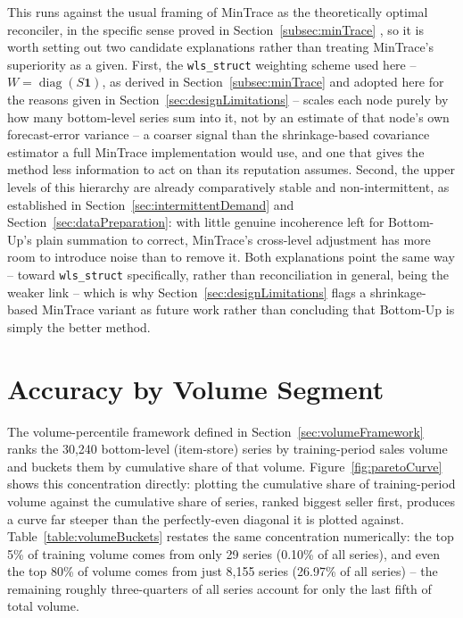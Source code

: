 This runs against the usual framing of MinTrace as the theoretically optimal reconciler, in the specific sense proved in Section~\ref{subsec:minTrace} \cite{Wickramasuriya:2019}, so it is worth setting out two candidate explanations rather than treating MinTrace's superiority as a given. First, the \texttt{wls\_struct} weighting scheme used here -- $W = \operatorname{diag}(S\mathbf{1})$, as derived in Section~\ref{subsec:minTrace} and adopted here for the reasons given in Section~\ref{sec:designLimitations} -- scales each node purely by how many bottom-level series sum into it, not by an estimate of that node's own forecast-error variance -- a coarser signal than the shrinkage-based covariance estimator a full MinTrace implementation would use, and one that gives the method less information to act on than its reputation assumes. Second, the upper levels of this hierarchy are already comparatively stable and non-intermittent, as established in Section~\ref{sec:intermittentDemand} and Section~\ref{sec:dataPreparation}: with little genuine incoherence left for Bottom-Up's plain summation to correct, MinTrace's cross-level adjustment has more room to introduce noise than to remove it. Both explanations point the same way -- toward \texttt{wls\_struct} specifically, rather than reconciliation in general, being the weaker link -- which is why Section~\ref{sec:designLimitations} flags a shrinkage-based MinTrace variant as future work rather than concluding that Bottom-Up is simply the better method.

\section{Accuracy by Volume Segment}
\label{sec:accuracyByVolume}

The volume-percentile framework defined in Section~\ref{sec:volumeFramework} ranks the 30,240 bottom-level (item-store) series by training-period sales volume and buckets them by cumulative share of that volume. Figure~\ref{fig:paretoCurve} shows this concentration directly: plotting the cumulative share of training-period volume against the cumulative share of series, ranked biggest seller first, produces a curve far steeper than the perfectly-even diagonal it is plotted against. Table~\ref{table:volumeBuckets} restates the same concentration numerically: the top 5\% of training volume comes from only 29 series (0.10\% of all series), and even the top 80\% of volume comes from just 8,155 series (26.97\% of all series) -- the remaining roughly three-quarters of all series account for only the last fifth of total volume.

